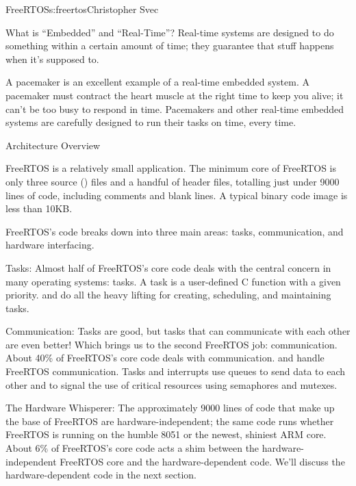 \begin{aosachapter}{FreeRTOS}{s:freertos}{Christopher Svec}
\begin{aosasect1}{What is ``Embedded'' and ``Real-Time''?}
Real-time systems are designed to do something within a certain amount
of time; they guarantee that stuff happens when it's
supposed to.

A pacemaker is an excellent example of a real-time embedded system. A
pacemaker must contract the heart muscle at the right time to keep you
alive; it can't be too busy to respond in time. Pacemakers and other
real-time embedded systems are carefully designed to run their tasks
on time, every time.

\end{aosasect1}

\begin{aosasect1}{Architecture Overview}

FreeRTOS is a relatively small application. The minimum core of
FreeRTOS is only three source () files and a handful of
header files, totalling just under 9000 lines of code, including
comments and blank lines. A typical binary code image is less than
10KB.

FreeRTOS's code breaks down into three main areas: tasks,
communication, and hardware interfacing.

\begin{aosaitemize}

\item{Tasks}: Almost half of FreeRTOS's core code deals with the
  central concern in many operating systems: tasks. A task is a
  user-defined C function with a given priority.
   and  do all the heavy lifting for
  creating, scheduling, and maintaining tasks.

\item{Communication}: Tasks are good, but tasks that can communicate
  with each other are even better!  Which brings us to the second
  FreeRTOS job: communication. About 40\% of FreeRTOS's core code
  deals with communication.
   and  handle FreeRTOS
  communication. Tasks and interrupts use queues to send data to each
  other and to signal the use of critical resources using semaphores
  and mutexes.

\item{The Hardware Whisperer}: The approximately 9000 lines of code
  that make up the base of FreeRTOS are hardware-independent;
  the same code runs whether FreeRTOS
  is running on the humble 8051 or the newest, shiniest ARM
  core.
  About 6\% of FreeRTOS's core code acts a shim between the
  hardware-independent FreeRTOS core and the hardware-dependent
  code. We'll discuss the hardware-dependent code in the next section.


\end{aosaitemize}
\end{aosasect1}
\end{aosachapter}
